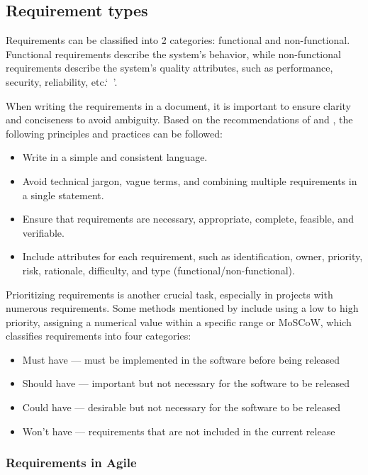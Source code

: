 \subsection{Requirement types}

Requirements can be classified into 2 categories: functional and non-functional. Functional requirements describe the system's behavior, while non-functional requirements describe the system's quality attributes, such as performance, security, reliability, etc.`\ '\parencite[6]{requirements}.

When writing the requirements in a document, it is important to ensure clarity and conciseness to avoid ambiguity. Based on the recommendations of \textcite[112]{requirements} and \textcite{requirements2}, the following principles and practices can be followed:  
\begin{itemize}
    \item Write in a simple and consistent language.
    \item Avoid technical jargon, vague terms, and combining multiple requirements in a single statement.
    \item Ensure that requirements are necessary, appropriate, complete, feasible, and verifiable.
    \item Include attributes for each requirement, such as identification, owner, priority, risk, rationale, difficulty, and type (functional/non-functional).
\end{itemize}

Prioritizing requirements is another crucial task, especially in projects with numerous requirements. Some methods mentioned by \textcite{moscow} include using a low to high priority, assigning a numerical value within a specific range or MoSCoW, which classifies requirements into four categories: 
\begin{itemize}
    \item Must have --- must be implemented in the software before being released
    \item Should have --- important but not necessary for the software to be released
    \item Could have --- desirable but not necessary for the software to be released
    \item Won't have --- requirements that are not included in the current release
\end{itemize}

\subsubsection{Requirements in Agile}

